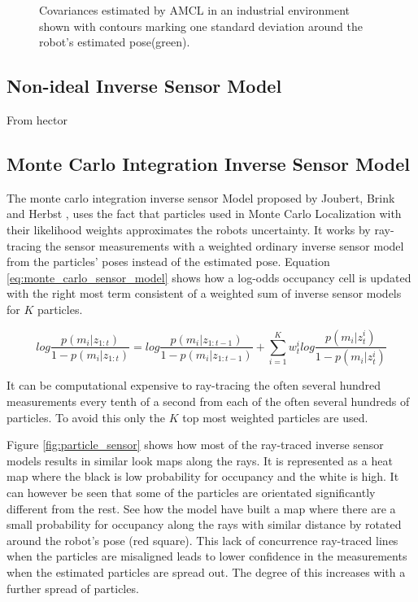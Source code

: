 \begin{figure}[tbph]
\begin{subfigure}[b]{0.2\textwidth}
		\label{fig:amcl_covariance_bar}
	\end{subfigure}
	\caption{Covariances estimated by AMCL in an industrial environment shown with contours marking one standard deviation around the robot's estimated pose(green).}
\end{figure}

\subsection{Non-ideal Inverse Sensor Model}
From hector

\subsection{Monte Carlo Integration Inverse Sensor Model}
\label{monte_carlo_sensor Model}
The monte carlo integration inverse sensor Model proposed by Joubert, Brink and Herbst \cite{Joubert2014},  uses the fact that particles used in Monte Carlo Localization with their likelihood weights approximates the robots uncertainty. 
It works by ray-tracing the sensor measurements with a weighted ordinary inverse sensor model from the particles' poses instead of the estimated pose. 
Equation \ref{eq:monte_carlo_sensor_model} shows how a log-odds occupancy cell is updated with the right most term consistent of a weighted sum of inverse sensor models for $K$ particles.

\begin{equation}
log \frac{p(m_i|z_{1:t})}{1-p(m_i|z_{1:t})} = log \frac{p(m_i|z_{1:t-1})}{1-p(m_i|z_{1:t-1})} + \sum_{i=1}^{K} w_t^i log \frac{ p(m_i | z_t^i) }{ 1 - p(m_i | z_t^i) }
\label{eq:monte_carlo_sensor_model}
\end{equation}

It can be computational expensive to ray-tracing the often several hundred measurements every tenth of a second from each of the often several hundreds of particles.
To avoid this only the $K$ top most weighted particles are used.%

Figure \ref{fig:particle_sensor} shows how most of the ray-traced inverse sensor models results in similar look maps along the rays. 
It is represented as a heat map where the black is low probability for occupancy and the white is high. 
It can however be seen that some of the particles are orientated significantly different from the rest. 
See how the model have built a map where there are a small probability for occupancy along the rays with similar distance by rotated around the robot's pose (red square). This lack of concurrence ray-traced lines when the particles are misaligned leads to lower confidence in the measurements when the estimated particles are spread out. The degree of this increases with a further spread of particles.

